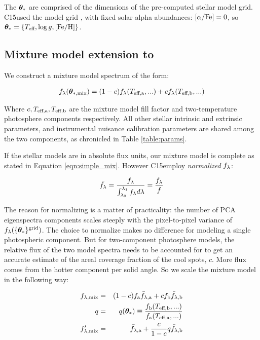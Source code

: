 \documentclass[onecolumn]{emulateapj}%
\newcommand{\iancze}{{\sc C15}}
\begin{document}
The ${\bm \theta}_{\ast}$ are comprised of the dimensions of the pre-computed stellar model grid.  \iancze used the \PHOENIX model grid \citep{2013A&A...553A...6H}, with fixed solar alpha abundances: $[\alpha/{\rm Fe}] = 0$, so ${\bm \theta}_{\ast} = \{T_\textrm{eff}, \log g, [{\rm Fe}/{\rm H}] \}$.

\subsection{Mixture model extension to \citet{2015ApJ...812..128C}}

We construct a mixture model spectrum of the form:


\begin{eqnarray} \label{eqn:simple_mix}
f_\lambda({\bm \theta}_{\ast, \mathrm{mix}}) = (1-c) f_\lambda(T_\textrm{eff,a}, ...) + c f_\lambda(T_\textrm{eff,b}, ...)
\end{eqnarray}

Where $c, T_\textrm{eff,a}, T_\textrm{eff,b}$ are the mixture model fill factor and two-temperature photosphere components respectively.  All other stellar intrinsic and extrinsic parameters, and instrumental nuisance calibration parameters are shared among the two components, as chronicled in Table \ref{table:params}.

If the stellar models are in absolute flux units, our mixture model is complete as stated in Equation \ref{eqn:simple_mix}.  However \iancze employ \emph{normalized} $f_\lambda$:


\begin{eqnarray} \label{eqn:normalization}
\bar {f_\lambda} = \frac{f_\lambda}{\int_{\lambda_0}^{\lambda_1} f_\lambda d\lambda} = \frac{f_\lambda}{f}
\end{eqnarray}

The reason for normalizing is a matter of practicality: the number of PCA eigenspectra components scales steeply with the pixel-to-pixel variance of $f_{\lambda}(\{{\bm \theta}_{\ast}\}^\textrm{grid})$.  The choice to normalize makes no difference for modeling a single photospheric component.  But for two-component photosphere models, the relative flux of the two model spectra needs to be accounted for to get an accurate estimate of the areal coverage fraction of the cool spots, $c$.  More flux comes from the hotter component per solid angle.  So we scale the mixture model in the following way:

\begin{eqnarray} \label{eqn:norm_scaling}
f_{\lambda, \mathrm{mix}} &=& (1-c) f_{\mathrm{a}}\bar f_{\lambda, \mathrm{a}} + c f_{\mathrm{b}} \bar f_{\lambda, \mathrm{b}} \\
q &=& q({\bm \theta}_{\ast})\equiv \frac{f_{\mathrm{b}}(T_\textrm{eff,b}, ...)}{f_{\mathrm{a}}(T_\textrm{eff,a}, ...)} \\
f_{\lambda, \mathrm{mix}}^{\prime} &=& \bar f_{\lambda, \mathrm{a}} + \frac{c}{1-c} q \bar f_{\lambda, \mathrm{b}} 
\end{eqnarray}
\end{document}
